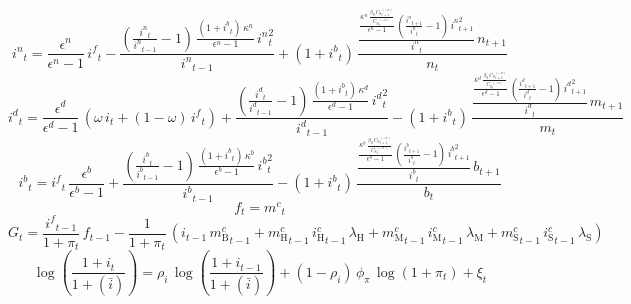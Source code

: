 \begin{dmath}
{i^n}_{t}=\frac{{\epsilon^n}}{{\epsilon^n}-1}\, {i^f}_{t}-\frac{\left(\frac{{i^n}_{t}}{{i^n}_{t-1}}-1\right)\, \frac{\left(1+{i^b}_{t}\right)\, {\kappa^n}}{{\epsilon^n}-1}\, {i^n}_{t}^{2}}{{i^n}_{t-1}}+\left(1+{i^b}_{t}\right)\, \frac{\frac{\frac{{\kappa^n}\, \frac{{\beta_\mathrm{S}}\, {C_\mathrm{S}}_{t+1}^{\left(-{\sigma}\right)}}{{C_\mathrm{S}}_{t}^{\left(-{\sigma}\right)}}}{{\epsilon^n}-1}\, \left(\frac{{i^n}_{t+1}}{{i^n}_{t}}-1\right)\, {i^n}_{t+1}^{2}}{{i^n}_{t}}\, {n}_{t+1}}{{n}_{t}}
\end{dmath}
\begin{dmath}
{i^d}_{t}=\frac{{\epsilon^d}}{{\epsilon^d}-1}\, \left({\omega}\, {i}_{t}+\left(1-{\omega}\right)\, {i^f}_{t}\right)+\frac{\left(\frac{{i^d}_{t}}{{i^d}_{t-1}}-1\right)\, \frac{\left(1+{i^b}_{t}\right)\, {\kappa^d}}{{\epsilon^d}-1}\, {i^d}_{t}^{2}}{{i^d}_{t-1}}-\left(1+{i^b}_{t}\right)\, \frac{\frac{\frac{{\kappa^d}\, \frac{{\beta_\mathrm{S}}\, {C_\mathrm{S}}_{t+1}^{\left(-{\sigma}\right)}}{{C_\mathrm{S}}_{t}^{\left(-{\sigma}\right)}}}{{\epsilon^d}-1}\, \left(\frac{{i^d}_{t+1}}{{i^d}_{t}}-1\right)\, {i^d}_{t+1}^{2}}{{i^d}_{t}}\, {m}_{t+1}}{{m}_{t}}
\end{dmath}
\begin{dmath}
{i^b}_{t}={i^f}_{t}\, \frac{{\epsilon^b}}{{\epsilon^b}-1}+\frac{\left(\frac{{i^b}_{t}}{{i^b}_{t-1}}-1\right)\, \frac{\left(1+{i^b}_{t}\right)\, {\kappa^b}}{{\epsilon^b}-1}\, {i^b}_{t}^{2}}{{i^b}_{t-1}}-\left(1+{i^b}_{t}\right)\, \frac{\frac{\frac{{\kappa^b}\, \frac{{\beta_\mathrm{S}}\, {C_\mathrm{S}}_{t+1}^{\left(-{\sigma}\right)}}{{C_\mathrm{S}}_{t}^{\left(-{\sigma}\right)}}}{{\epsilon^b}-1}\, \left(\frac{{i^b}_{t+1}}{{i^b}_{t}}-1\right)\, {i^b}_{t+1}^{2}}{{i^b}_{t}}\, {b}_{t+1}}{{b}_{t}}
\end{dmath}
\begin{dmath}
{f}_{t}={m^c}_{t}
\end{dmath}
\begin{dmath}
{G}_{t}=\frac{{i^f}_{t-1}}{1+{\pi}_{t}}\, {f}_{t-1}-\frac{1}{1+{\pi}_{t}}\, \left({i}_{t-1}\, {m^c_\mathrm{B}}_{t-1}+{m^c_\mathrm{H}}_{t-1}\, {i^c_\mathrm{H}}_{t-1}\, {\lambda_\mathrm{H}}+{m^c_\mathrm{M}}_{t-1}\, {i^c_\mathrm{M}}_{t-1}\, {\lambda_\mathrm{M}}+{m^c_\mathrm{S}}_{t-1}\, {i^c_\mathrm{S}}_{t-1}\, {\lambda_\mathrm{S}}\right)
\end{dmath}
\begin{dmath}
\log\left(\frac{1+{i}_{t}}{1+(\bar{i})}\right)={\rho_i}\, \log\left(\frac{1+{i}_{t-1}}{1+(\bar{i})}\right)+\left(1-{\rho_i}\right)\, {\phi_\pi}\, \log\left(1+{\pi}_{t}\right)+{\xi}_{t}
\end{dmath}

